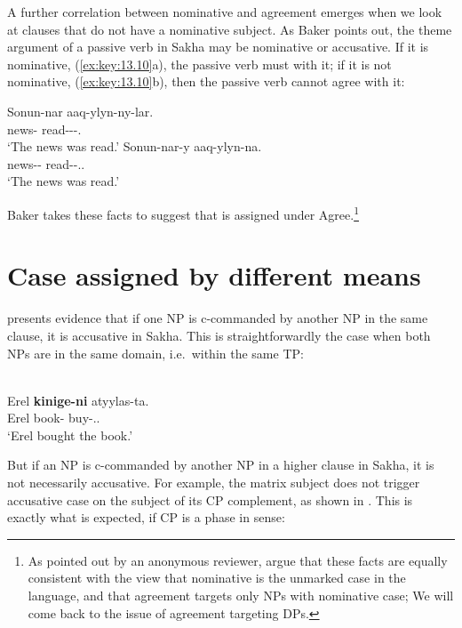 \documentclass[output=paper]{langsci/langscibook}
\begin{document}
A further correlation between nominative and agreement emerges when we look at
clauses that do not have a nominative subject. As Baker points out, the theme
argument of a passive verb in Sakha may be nominative or accusative. If it is
nominative, (\ref{ex:key:13.10}a), the passive verb must  with it; if it
is not nominative, (\ref{ex:key:13.10}b), then the passive verb cannot agree
with it:

\ea%
    \label{ex:key:13.10} \parencite[32]{Baker2015}
	\ea
	\gll  Sonun-nar aaq-ylyn-ny-lar.\\
    news-\Pl{}  read-\Pass{}-\Pst{}-\Tpl.\Sbj{}\\
	\glt     ‘The news was read.’
	\ex
	\gll  Sonun-nar-y aaq-ylyn-na.\\
	    news-\Pl{}-\Acc{}  read-\Pass{}-\Pst{}.\Tsg.\Sbj{}\\
	\glt     ‘The news was read.’
    \z
\z

Baker takes these facts to suggest that \Nom{} is assigned under
Agree.\footnote{As pointed out by an anonymous reviewer, \citet{LevPre2015}
    argue that these facts are equally consistent with the view that nominative
    is the unmarked case in the language, and that agreement targets only NPs
with nominative case; We will come back to the issue of agreement targeting \Nom{}
DPs.}

\section{Case assigned by different means}\label{sec:key:13.3}

\textcite[112f.]{Baker2015} presents evidence that if one NP is c-commanded by
another NP in the same clause, it is accusative in Sakha. This is
straightforwardly the case when both NPs are in the same domain, i.e.\ within
the same TP:

\ea%
    \label{ex:key:13.11} \parencite[112]{Baker2015}\\
    \gll  Erel  \textbf{kinige-ni}  atyylas-ta.\\
          Erel book-\Acc{}  buy-\Pst{}.\Tsg.\Sbj{}\\
    \glt  ‘Erel bought the book.’
\z

But if an NP is c-commanded by another NP in a higher clause in Sakha, it is
not necessarily accusative. For example, the matrix subject does not trigger
accusative case on the subject of its CP complement, as shown in
. This is exactly what is expected, if CP is a
phase in  sense:
\end{document}
